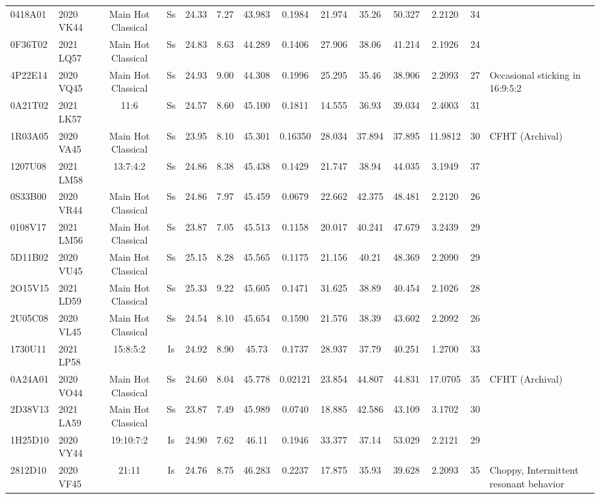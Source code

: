 \begin{longrotatetable}
\begin{longtable}{ll|ccccccccccc | l}
0418A01 & 2020 VK44 & Main Hot Classical & Ss & 24.33 & 7.27 & 43.983 & 0.1984 & 21.974 & 35.26 & 50.327 & 2.2120 & 34 & \\ 
0F36T02 & 2021 LQ57 & Main Hot Classical & Ss & 24.83 & 8.63 & 44.289 & 0.1406 & 27.906 & 38.06 & 41.214 & 2.1926 & 24 & \\ 
4P22E14 & 2020 VQ45 & Main Hot Classical & Ss & 24.93 & 9.00 & 44.308 & 0.1996 & 25.295 & 35.46 & 38.906 & 2.2093 & 27 & Occasional sticking in 16:9:5:2   \\ 
0A21T02 & 2021 LK57 & 11:6 & Ss & 24.57 & 8.60 & 45.100 & 0.1811 & 14.555 & 36.93 & 39.034 & 2.4003 & 31 & \\ 
1R03A05 & 2020 VA45 & Main Hot Classical & Ss & 23.95 & 8.10 & 45.301 & 0.16350 & 28.034 & 37.894 & 37.895 & 11.9812 & 30 & CFHT (Archival)  \\ 
1207U08 & 2021 LM58 & 13:7:4:2 & Ss & 24.86 & 8.38 & 45.438 & 0.1429 & 21.747 & 38.94 & 44.035 & 3.1949 & 37 & \\ 
0S33B00 & 2020 VR44 & Main Hot Classical & Ss & 24.86 & 7.97 & 45.459 & 0.0679 & 22.662 & 42.375 & 48.481 & 2.2120 & 26 & \\ 
0108V17 & 2021 LM56 & Main Hot Classical & Ss & 23.87 & 7.05 & 45.513 & 0.1158 & 20.017 & 40.241 & 47.679 & 3.2439 & 29 & \\ 
5D11B02 & 2020 VU45 & Main Hot Classical & Ss & 25.15 & 8.28 & 45.565 & 0.1175 & 21.156 & 40.21 & 48.369 & 2.2090 & 29 & \\ 
2O15V15 & 2021 LD59 & Main Hot Classical & Ss & 25.33 & 9.22 & 45.605 & 0.1471 & 31.625 & 38.89 & 40.454 & 2.1026 & 28 & \\ 
2U05C08 & 2020 VL45 & Main Hot Classical & Ss & 24.54 & 8.10 & 45.654 & 0.1590 & 21.576 & 38.39 & 43.602 & 2.2092 & 26 & \\ 
1730U11 & 2021 LP58 & 15:8:5:2 & Is & 24.92 & 8.90 & 45.73 & 0.1737 & 28.937 & 37.79 & 40.251 & 1.2700 & 33 & \\ 
0A24A01 & 2020 VO44 & Main Hot Classical & Ss & 24.60 & 8.04 & 45.778 & 0.02121 & 23.854 & 44.807 & 44.831 & 17.0705 & 35 & CFHT (Archival)  \\ 
2D38V13 & 2021 LA59 & Main Hot Classical & Ss & 23.87 & 7.49 & 45.989 & 0.0740 & 18.885 & 42.586 & 43.109 & 3.1702 & 30 & \\ 
1H25D10 & 2020 VY44 & 19:10:7:2 & Is & 24.90 & 7.62 & 46.11 & 0.1946 & 33.377 & 37.14 & 53.029 & 2.2121 & 29 & \\ 
2812D10 & 2020 VF45 & 21:11 & Is & 24.76 & 8.75 & 46.283 & 0.2237 & 17.875 & 35.93 & 39.628 & 2.2093 & 35 & Choppy, Intermittent resonant behavior  \\ 

\end{longtable}
\end{longrotatetable}
